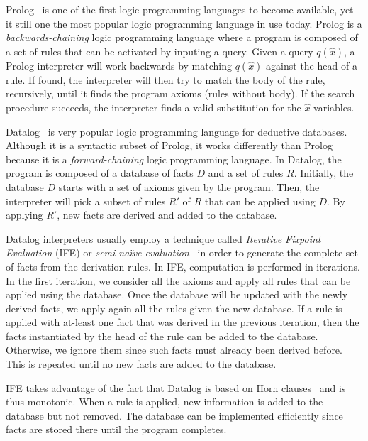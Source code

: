 
Prolog~\cite{Colmerauer:1993:BP:154766.155362} is one of the first logic programming languages to become available, yet it still one the most popular logic programming language in use today. Prolog is a \emph{backwards-chaining} logic programming language where a program is composed of a set of rules that can be activated by inputing a query. Given a query $q(\hat{x})$, a Prolog interpreter will work backwards by matching $q(\hat{x})$ against the head of a rule. If found, the interpreter will then try to match the body of the rule, recursively, until it finds the program axioms (rules without body). If the search procedure succeeds, the interpreter finds a valid substitution for the $\hat{x}$ variables.

Datalog~\cite{Ramakrishnan93asurvey} is very popular logic programming language for deductive databases. Although it is a syntactic subset of Prolog, it works differently than Prolog because it is a \emph{forward-chaining} logic programming language. In Datalog, the program is composed of a database of facts $D$ and a set of rules $R$. Initially, the database $D$ starts with a set of axioms given by the program. Then, the interpreter will pick a subset of rules $R'$ of $R$ that can be applied using $D$. By applying $R'$, new facts are derived and added to the database.

Datalog interpreters usually employ a technique called \emph{Iterative Fixpoint Evaluation} (IFE) or \emph{semi-na\"{i}ve evaluation}~\cite{Ramakrishnan93asurvey} in order to generate the complete set of facts from the derivation rules. In IFE, computation is performed in iterations. In the first iteration, we consider all the axioms and
apply all rules that can be applied using the database. Once the database will be updated with the newly derived facts, we apply again all the rules given
the new database. If a rule is applied with at-least one fact that was derived in the previous iteration, then the facts instantiated by the head of the
rule can be added to the database. Otherwise, we ignore them since such facts must already been derived before. This is repeated until no new facts are
added to the database.

IFE takes advantage of the fact that Datalog is based on Horn clauses~\cite{journals/jsyml/Horn51} and is thus monotonic. When a rule is applied, new information is added to the database but not removed. The database can be implemented efficiently since facts are stored there until the program completes.

